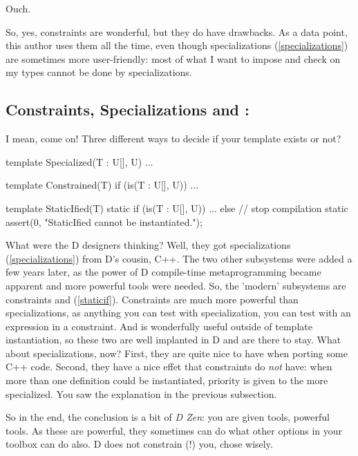 Ouch. 

So, yes, constraints are wonderful, but they do have drawbacks. As a data point, this author uses them all the time, even though specializations (\ref{specializations}) are sometimes more user-friendly: most of what I want to impose and check on my types cannot be done by specializations. 

\subsection{Constraints, Specializations and :}
\label{constraintsorspecializations}

I mean, come on! Three different ways to decide if your template exists or not? 

\begin{dcode}
template Specialized(T : U[], U)
{ ... }

template Constrained(T) if (is(T : U[], U))
{ ... }

template StaticIfied(T)
{
    static if (is(T : U[], U))
    { ... }
    else // stop compilation
        static assert(0, "StaticIfied cannot be instantiated.");
}
\end{dcode}

What were the D designers thinking? Well, they got specializations (\ref{specializations}) from D's cousin, C++. The two other subsystems were added a few years later, as the power of D compile-time metaprogramming became apparent and more powerful tools were needed. So, the 'modern' subsystems are constraints and  (\ref{staticif}). Constraints are much more powerful than specializations, as anything you can test with specialization, you can test with an  expression in a constraint. And  is wonderfully useful outside of template instantiation, so these two are well implanted in D and are there to stay.
What about specializations, now? First, they are quite nice to have when porting some C++ code. Second, they have a nice effet that constraints do \emph{not} have: when more than one definition could be instantiated, priority is given to the more specialized. You saw the explanation in the previous subsection.

So in the end, the conclusion is a bit of \emph{D Zen}: you are given tools, powerful tools. As these are powerful, they sometimes can do what other options in your toolbox can do also. D does not constrain (!) you, chose wisely.

